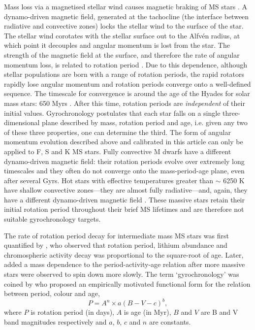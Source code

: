 \documentclass[useAMS, usenatbib]{mn2e}
\begin{document}
Mass loss via a magnetised stellar wind causes magnetic braking of MS stars
\citep{Weber1967}.
A dynamo-driven magnetic field, generated at the tachocline (the interface
between radiative and convective zones) locks the stellar wind to the surface
of the star.
The stellar wind corotates with the stellar surface out to the Alfv\'{e}n
radius, at which point it decouples and angular momentum is lost from the
star.
The strength of the magnetic field at the surface, and therefore the rate of
angular momentum loss, is related to rotation period \citep{Kawaler1988}.
Due to this dependence, although stellar populations are born with a range of
rotation periods, the rapid rotators rapidly lose angular momentum and
rotation periods converge onto a well-defined sequence.
The timescale for convergence is around the age of the Hyades for solar mass
stars: 650 Myrs \citep{Radick1987, Irwin2009}.
After this time, rotation periods are \emph{independent} of their initial
values.
Gyrochronology postulates that each star falls on a single three-dimensional
plane described by mass, rotation period and age, i.e. given any two of these
three properties, one can determine the third.
The form of angular momentum evolution described above and calibrated in this
article can only be applied to F, S and K MS stars.
Fully convective M dwarfs have a different dynamo-driven magnetic field: their
rotation periods evolve over extremely long timescales and they often do not
converge onto the mass-period-age plane, even after several Gyrs.
Hot stars with effective temperatures greater than $\sim$ 6250 K have shallow
convective zones---they are almost fully radiative---and, again, they have
a different dynamo-driven magnetic field \citep{Kraft1967}.
These massive stars retain their initial rotation period throughout their
brief MS lifetimes and are therefore not suitable gyrochronology targets.

The rate of rotation period decay for intermediate mass MS stars was first
quantified by \citet{Skumanich1972}, who observed that rotation period,
lithium abundance and chromospheric activity decay was proportional to the
square-root of age.
Later, \citet{Noyes1984_2} added a mass dependence to the period-activity-age
relation after more massive stars were observed to spin down more slowly.
The term `gyrochronology' was coined by \citet{Barnes2003} who proposed an
empirically motivated functional form for the relation between period, colour
and age, \begin{equation} \label{eq:Barnes2007_2} P = A^n \times a(B-V-c)^b,
\end{equation} where $P$ is rotation period (in days), $A$ is age (in Myr),
$B$ and $V$ are B and V band magnitudes respectively and $a$, $b$, $c$ and $n$
are constants.
\end{document}

